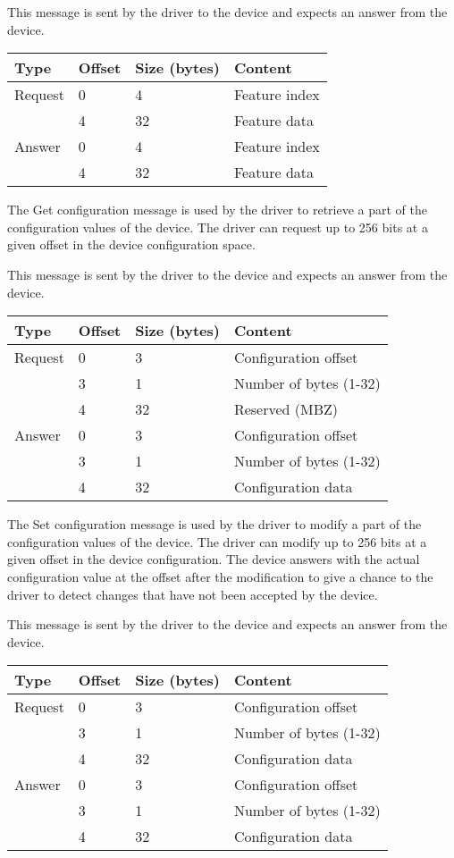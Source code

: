 This message is sent by the driver to the device and expects an answer from the
device.

\begin{tabular}{|l|l|l|l|}
\hline
Type & Offset & Size (bytes) & Content \\
\hline \hline
Request & 0 & 4 & Feature index \\
& 4 & 32 & Feature data \\
\hline
Answer & 0 & 4 & Feature index \\
& 4 & 32 & Feature data \\
\hline
\end{tabular}


The Get configuration message is used by the driver to retrieve a part of the
configuration values of the device. The driver can request up to 256 bits at
a given offset in the device configuration space.

This message is sent by the driver to the device and expects an answer from the
device.

\begin{tabular}{|l|l|l|l|}
\hline
Type & Offset & Size (bytes) & Content \\
\hline \hline
Request & 0 & 3 & Configuration offset \\
& 3 & 1 & Number of bytes (1-32) \\
& 4 & 32 & Reserved (MBZ) \\
\hline
Answer & 0 & 3 & Configuration offset \\
& 3 & 1 & Number of bytes (1-32) \\
& 4 & 32 & Configuration data \\
\hline
\end{tabular}


The Set configuration message is used by the driver to modify a part of the
configuration values of the device. The driver can modify up to 256 bits at a
given offset in the device configuration. The device answers with the actual
configuration value at the offset after the modification to give a chance to the
driver to detect changes that have not been accepted by the device.

This message is sent by the driver to the device and expects an answer from the
device.

\begin{tabular}{|l|l|l|l|}
\hline
Type & Offset & Size (bytes) & Content \\
\hline \hline
Request & 0 & 3 & Configuration offset \\
& 3 & 1 & Number of bytes (1-32) \\
& 4 & 32 & Configuration data \\
\hline
Answer & 0 & 3 & Configuration offset \\
& 3 & 1 & Number of bytes (1-32) \\
& 4 & 32 & Configuration data \\
\hline
\end{tabular}

